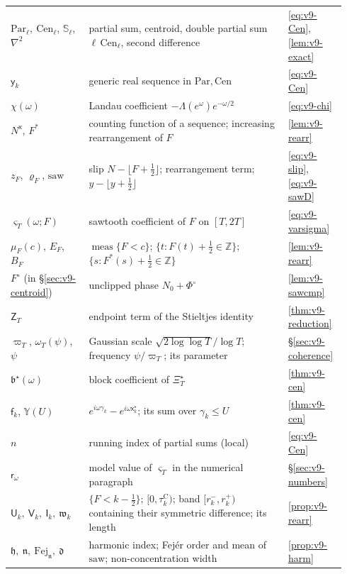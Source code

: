 \documentclass[11pt,a4paper]{article}
\numberwithin{equation}{section}
\theoremstyle{definition}
\theoremstyle{remark}
\newcommand{\meas}{\operatorname{meas}}
\begin{document}
\begin{longtable}{@{}p{0.22\linewidth}p{0.56\linewidth}p{0.16\linewidth}@{}}
$\mathrm{Par}_\ell,\ \mathrm{Cen}_\ell$, $\mathbb S_\ell$, $\nabla^2$ & partial sum, centroid, double partial sum $\ell\,\mathrm{Cen}_\ell$, second difference & \eqref{eq:v9-Cen}, \cref{lem:v9-exact}\\
$\mathsf y_k$ & generic real sequence in $\mathrm{Par},\mathrm{Cen}$ & \eqref{eq:v9-Cen}\\
$\chi(\omega)$ & Landau coefficient $-\Lambda(e^\omega)e^{-\omega/2}$ & \eqref{eq:v9-chi}\\
$N^{\mathsf x}$, $F^*$ & counting function of a sequence; increasing rearrangement of $F$ & \cref{lem:v9-rearr}\\
$z_F$, $\varrho_F$, $\mathrm{saw}$ & slip $N-\lfloor F+\frac12\rfloor$; rearrangement term; $y-\lfloor y+\frac12\rfloor$ & \eqref{eq:v9-slip}, \eqref{eq:v9-sawD}\\
$\varsigma_T(\omega;F)$ & sawtooth coefficient of $F$ on $[T,2T]$ & \eqref{eq:v9-varsigma}\\
$\mu_F(c)$, $E_F$, $B_F$ & $\meas\{F<c\}$; $\{t:F(t)+\frac12\in\mathbb Z\}$; $\{s:F^*(s)+\frac12\in\mathbb Z\}$ & \cref{lem:v9-rearr}\\
$F^\circ$ (in \S\ref{sec:v9-centroid}) & unclipped phase $N_0+\Phi^\circ$ & \cref{lem:v9-sawcmp}\\
$\mathsf Z_T$ & endpoint term of the Stieltjes identity & \cref{thm:v9-reduction}\\
$\varpi_T$, $\omega_T(\psi)$, $\psi$ & Gaussian scale $\sqrt{2\log\log T}/\log T$; frequency $\psi/\varpi_T$; its parameter & \S\ref{sec:v9-coherence}\\
$\mathfrak b^\star(\omega)$ & block coefficient of $\Xi_T^\star$ & \cref{thm:v9-cen}\\
$\mathsf f_k$, $\mathbb Y(U)$ & $e^{i\omega\gamma_k}-e^{i\omega\mathsf x_k^\star}$; its sum over $\gamma_k\le U$ & \cref{thm:v9-cen}\\
$n$ & running index of partial sums (local) & \eqref{eq:v9-Cen}\\
$\mathsf r_\omega$ & model value of $\varsigma_T$ in the numerical paragraph & \S\ref{sec:v9-numbers}\\
$\mathsf U_k,\ \mathsf V_k,\ \mathsf I_k,\ \mathfrak w_k$ & $\{F<k-\frac12\}$; $[0,\tau_k^{\mathrm C})$; band $[r_k^-,r_k^+)$ containing their symmetric difference; its length & \cref{prop:v9-rearr}\\
$\mathfrak h,\ \mathfrak n,\ \mathrm{Fej}_{\mathfrak n},\ \mathfrak d$ & harmonic index; Fej\'er order and mean of $\mathrm{saw}$; non-concentration width & \cref{prop:v9-harm}\\

\end{longtable}
\end{document}
